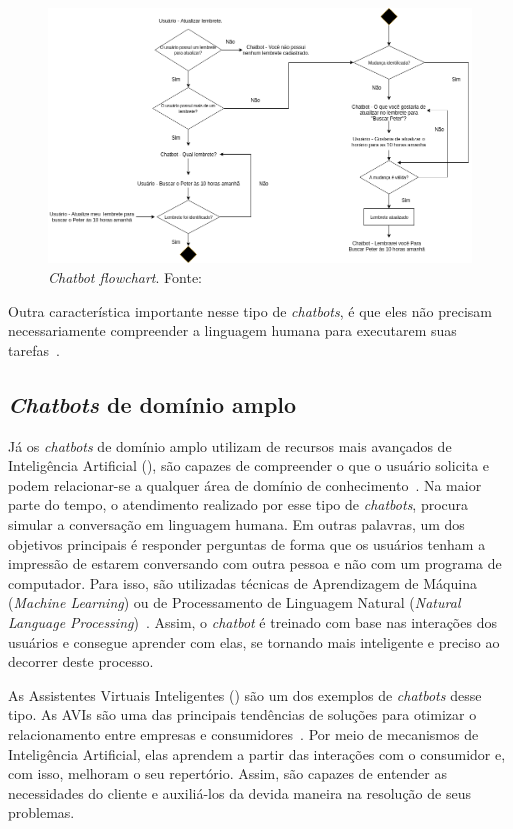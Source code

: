 \begin{figure}
\centering
\includegraphics[width=0.9\linewidth]{src/imagens/Chatbot.png}
\caption{\textit{Chatbot flowchart}. Fonte:~\cite{Samer}}
\label{cap:01:fig:fluxograma}
\end{figure}

Outra característica importante nesse tipo de \textit{chatbots}, é que eles não precisam necessariamente compreender a linguagem humana para executarem suas tarefas~\cite{Juliano}.

\subsection{\textit{Chatbots} de domínio amplo}\label{cap:02:sec:01:sub:02:bot-dominio}

Já os \textit{chatbots} de domínio amplo utilizam de recursos mais avançados de Inteligência Artificial (), são capazes de compreender o que o usuário solicita e podem relacionar-se a qualquer área de domínio de conhecimento~\cite{Juliano}. 
Na maior parte do tempo, o atendimento realizado por esse tipo de \textit{chatbots}, procura simular a conversação em linguagem humana.
Em outras palavras, um dos objetivos principais é responder perguntas de forma que os usuários tenham a impressão de estarem conversando com outra pessoa e não com um programa de computador.
Para isso, são utilizadas técnicas de Aprendizagem de Máquina (\textit{Machine Learning}) ou de Processamento de Linguagem Natural (\textit{Natural Language Processing})~\cite{Falaki}. 
Assim, o \textit{chatbot} é treinado com base nas interações dos usuários e consegue aprender com elas, se tornando mais inteligente e preciso ao decorrer deste processo.

As Assistentes Virtuais Inteligentes () são um dos exemplos de \textit{chatbots} desse tipo. 
As AVIs são uma das principais tendências de soluções para otimizar o relacionamento entre empresas e consumidores~\cite{DDS}. 
Por meio de mecanismos de Inteligência Artificial, elas aprendem a partir das interações com o consumidor e, com isso, melhoram o seu repertório. 
Assim, são capazes de entender as necessidades do cliente e auxiliá-los da devida maneira na resolução de seus problemas.

